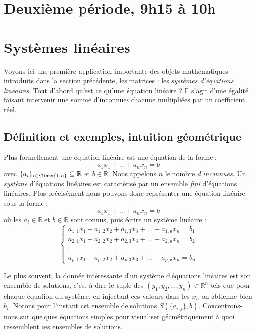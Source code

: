 \documentclass{article}
\newcommand{\R}{\mathbb{R}}
\begin{document}
\newpage

\section*{Deuxième période, 9h15 à 10h}

\section{Systèmes linéaires}
\noindent Voyons ici une première application importante des objets mathématiques introduits dans la section précédente, les matrices : les \textit{systèmes d'équations linéaires}. Tout d'abord qu'est ce qu'une équation linéaire ? Il s'agit d'une égalité faisant intervenir une somme d'inconnues chacune multipliées par un coefficient réel. 

\subsection{Définition et exemples, intuition géométrique}
\noindent Plus formellement une équation linéaire est une équation de la forme : 
$$a_1 x_1 + ... + a_n x_n = b$$
avec $\{a_i \}_{i \in \Iintv{1,n}} \subseteq \mathbb{R}$ et $b\in \mathbb{R}$. Nous appelons $n$ le nombre \textit{d'inconnues}. Un \textit{système} d'équations linéaires est caractérisé par un ensemble \textit{fini} d'équations linéaires. Plus précisément nous pouvons donc représenter une équation linéaire sous la forme :
$$a_1 x_1 + ... + a_n x_n = b
$$
où les $a_i \in \R$ et $b \in \R$ sont connus, puis écrire un système linéaire :
$$\begin{cases} a_{1,1}x_1 + a_{1,2}x_2 + a_{1,3}x_3 + ... + a_{1, n}x_n = b_1 \\ a_{2,1}x_1 + a_{2,2}x_2 + a_{2,3}x_3 + ... + a_{2, n}x_n =b_2 \\ \vdots \\ a_{p,1}x_1 + a_{p,2}x_2 + a_{p,3}x_3 + ... + a_{p, n}x_n = b_p \end{cases}$$

\noindent Le plus souvent, la donnée intéressante d'un système d'équations linéaires est son ensemble de solutions, c'est à dire le tuple des $(y_1, y_2, \ldots, y_n)\in \mathbb{R}^n$ tels que pour chaque équation du système, en injectant ces valeurs dans les $x_n$ on obtienne bien $b_i$. Notons pour l'instant cet ensemble de solutions $S(\{a_{i,j}\},b)$. Concentrons-nous sur quelques équations simples pour visualiser géométriquement à quoi ressemblent ces ensembles de solutions.\\
\end{document}
